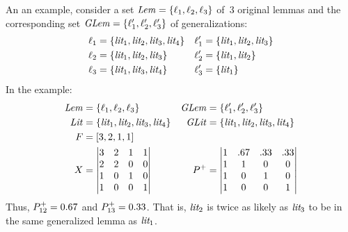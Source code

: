 An an example, consider a set $\mathit{Lem} = \{\ell_1, \ell_2, \ell_3\}$ of~3 original lemmas and the corresponding set $\mathit{GLem} = \{\ell'_1, \ell'_2, \ell'_3\}$ of generalizations: 
{\small\begin{align*}
   \ell_1 &= \{\textit{lit}_1, \textit{lit}_2, \textit{lit}_3, \textit{lit}_4\} &  \ell'_1 &= \{\textit{lit}_1, \textit{lit}_2, \textit{lit}_3\} \\
   \ell_2 &= \{\textit{lit}_1, \textit{lit}_2, \textit{lit}_3\} &  \ell'_2 &= \{\textit{lit}_1, \textit{lit}_2\} \\
   \ell_3 &= \{\textit{lit}_1, \textit{lit}_3, \textit{lit}_4\} & \ell'_3 &= \{\textit{lit}_1\}
\end{align*}}%
In the example:
\begin{align*}
    \mathit{Lem} &=\{\ell_1, \ell_2, \ell_3\} & \mathit{GLem} &=\{\ell_1', \ell_2', \ell_3'\}\\
    \mathit{Lit} &=\{\textit{lit}_1, \textit{lit}_2, \textit{lit}_3, \textit{lit}_4\} & \mathit{GLit} &=\{\textit{lit}_1, \textit{lit}_2, \textit{lit}_3, \textit{lit}_4\}\\
  F &= [3, 2, 1, 1] \\
  X &= 
  \begin{vmatrix}
    3 & 2 & 1 & 1 \\
    2 & 2 & 0 & 0 \\
    1 & 0 & 1 & 0 \\
    1 & 0 & 0 & 1
    \end{vmatrix}
    &
  P^+ &= 
  \begin{vmatrix}
    1 & .67 & .33 & .33 \\
    1 & 1 & 0 & 0 \\
    1 & 0 & 1 & 0 \\
    1 & 0 & 0 & 1
  \end{vmatrix}
\end{align*}
Thus, $P^+_{12} = 0.67$ and $P^+_{13} = 0.33$. That is,
 $\textit{lit}_2$ is twice as likely as $\textit{lit}_3$ to be in the same generalized lemma as $\textit{lit}_1$.

